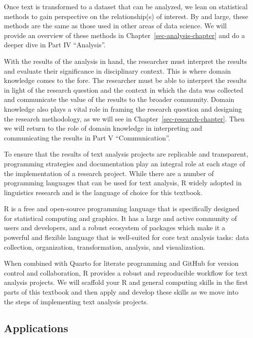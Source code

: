 \documentclass[
  letterpaper,
]{latex/krantz}
\theoremstyle{definition}
\theoremstyle{remark}
\begin{document}
Once text is transformed to a dataset that can be analyzed, we lean on
statistical methods to gain perspective on the relationship(s) of
interest. By and large, these methods are the same as those used in
other areas of data science. We will provide an overview of these
methods in Chapter~\ref{sec-analysis-chapter} and do a deeper dive in
Part IV ``Analysis''.

With the results of the analysis in hand, the researcher must interpret
the results and evaluate their significance in disciplinary context.
This is where domain knowledge comes to the fore. The researcher must be
able to interpret the results in light of the research question and the
context in which the data was collected and communicate the value of the
results to the broader community. Domain knowledge also plays a vital
role in framing the research question and designing the research
methodology, as we will see in Chapter~\ref{sec-research-chapter}. Then
we will return to the role of domain knowledge in interpreting and
communicating the results in Part V ``Communication''.

To ensure that the results of text analysis projects are replicable and
transparent, programming strategies and documentation play an integral
role at each stage of the implementation of a research project. While
there are a number of programming languages that can be used for text
analysis, R widely adopted in linguistics research and is the language
of choice for this textbook.

R is a free and open-source programming language that is specifically
designed for statistical computing and graphics. It has a large and
active community of users and developers, and a robust ecosystem of
packages which make it a powerful and flexible language that is
well-suited for core text analysis tasks: data collection, organization,
transformation, analysis, and visualization.

When combined with Quarto for literate programming and GitHub for
version control and collaboration, R provides a robust and reproducible
workflow for text analysis projects. We will scaffold your R and general
computing skills in the first parts of this textbook and then apply and
develop these skills as we move into the steps of implementing text
analysis projects.

\subsection{Applications}\label{applications}
\end{document}
